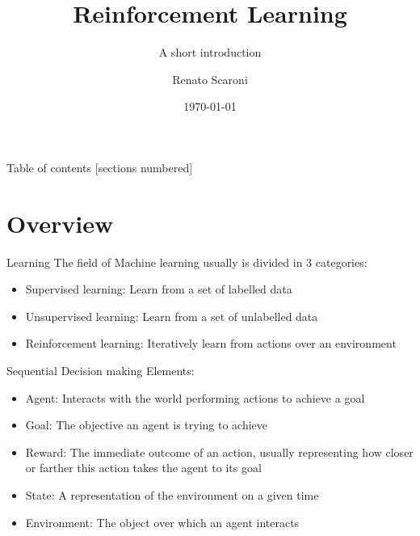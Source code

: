 \documentclass[10pt]{beamer}
\title{Reinforcement Learning}
\subtitle{A short introduction}
\date{\today}
\date{}
\author{Renato Scaroni}
\institute{}
\begin{document}
\maketitle

\begin{frame}{Table of contents}
  [sections numbered]
  \tableofcontents[hideallsubsections]
\end{frame}

\section{Overview}

\begin{frame}{Learning}
    The field of Machine learning usually is divided in 3 categories:
    \begin{itemize}
        \item Supervised learning: Learn from a set of labelled data
        \item Unsupervised learning: Learn from a set of unlabelled data
        \item Reinforcement learning: Iteratively learn from actions over an environment
    \end{itemize}
\end{frame}

\begin{frame}{Sequential Decision making}
    Elements:
    \begin{itemize}
        \item Agent: Interacts with the world performing actions to achieve a goal
        \item Goal: The objective an agent is trying to achieve
        \item Reward: The immediate outcome of an action, usually representing how closer or farther this action takes the agent to its goal
        \item State: A representation of the environment on a given time
        \item Environment: The object over which an agent interacts
    \end{itemize}
\end{frame}
\end{document}
